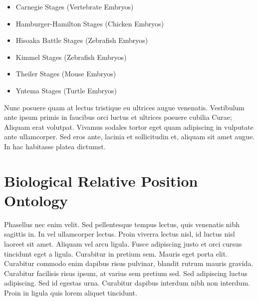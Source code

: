 \begin{itemize}
\item Carnegie Stages\cite{CarnegieStage} (Vertebrate Embryos)
\item Hamburger-Hamilton Stages\cite{HamburgerHamiltonStage} (Chicken Embryos)
\item Hisoaka Battle Stages\cite{HisaokaBattleStage} (Zebrafish Embryos)
\item Kimmel Stages\cite{KimmelStage} (Zebrafish Embryos)
\item Theiler Stages\cite{TheilerStage} (Mouse Embryos)
\item Yntema Stages\cite{YntemaStage} (Turtle Embryos)
\end{itemize}

Nunc posuere quam at lectus tristique eu ultrices augue venenatis. Vestibulum ante ipsum primis in faucibus orci luctus et ultrices posuere cubilia Curae; Aliquam erat volutpat. Vivamus sodales tortor eget quam adipiscing in vulputate ante ullamcorper. Sed eros ante, lacinia et sollicitudin et, aliquam sit amet augue. In hac habitasse platea dictumst.


\section{Biological Relative Position Ontology}

Phasellus nec enim velit. Sed pellentesque tempus lectus, quis
venenatis nibh sagittis in. In vel ullamcorper lectus. Proin viverra
lectus nisl, id luctus nisl laoreet sit amet. Aliquam vel arcu
ligula. Fusce adipiscing justo et orci cursus tincidunt eget a
ligula. Curabitur in pretium sem. Mauris eget porta elit. Curabitur
commodo enim dapibus risus pulvinar, blandit rutrum mauris
gravida. Curabitur facilisis risus ipsum, at varius sem pretium
sed. Sed adipiscing luctus adipiscing. Sed id egestas urna. Curabitur
dapibus interdum nibh non interdum. Proin in ligula quis lorem aliquet
tincidunt.
